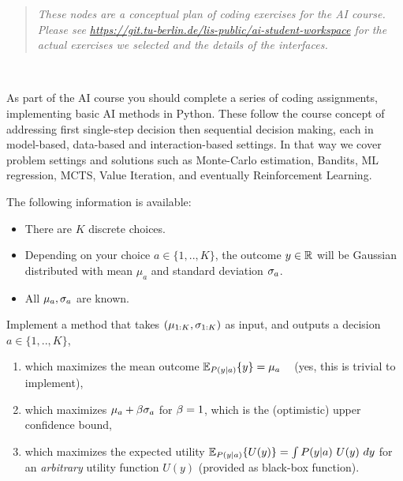 

\renewcommand{\course}{Artificial Intelligence}
\renewcommand{\coursepicture}{course_ai}
\renewcommand{\coursedate}{Summer 2023}
\renewcommand{\exnum}{Plan of Coding Assignments}
\renewcommand{\teacher}{Marc Toussaint}

\exercises

\newcommand{\notes}[1]{\medskip{\scriptsize #1}\medskip}

\exercisestitle


\begin{quote}
\emph{These nodes are a conceptual plan of coding exercises for the AI course. Please see \url{https://git.tu-berlin.de/lis-public/ai-student-workspace} for the actual exercises we selected and the details of the interfaces.}
\end{quote}

~

As part of the AI course you should complete a series of coding assignments, implementing basic AI methods in Python. These follow the course concept of addressing first single-step decision then sequential decision making, each in model-based, data-based and interaction-based settings. In that way we cover problem settings and solutions such as Monte-Carlo estimation, Bandits, ML regression, MCTS, Value Iteration, and eventually Reinforcement Learning.

{\small\tableofcontents}




The following information is available:
\begin{itemize}
\item There are $K$ discrete choices.
\item Depending on your choice $a\in\{1,..,K\}$, the outcome $y\in\RRR$ will be Gaussian distributed with mean $\mu_a$ and standard deviation $\s_a$.
\item All $\mu_a,\s_a$ are known.
\end{itemize}

Implement a method that takes $(\mu_{1:K}, \s_{1:K})$ as input, and outputs a decision $a\in\{1,..,K\}$,
\begin{enumerate}
\item which maximizes the mean outcome $\Exp[P(y|a)]{y} = \mu_a$ ~ (yes, this is trivial to implement),
\item which maximizes $\mu_a + \b \s_a$ for $\b=1$, which is the (optimistic) upper confidence bound,
\item which maximizes the expected utility $\Exp[P(y|a)]{U(y)} = \int P(y|a)~ U(y)~ dy$ for an \emph{arbitrary} utility function $U(y)$ (provided as black-box function).
\end{enumerate}

